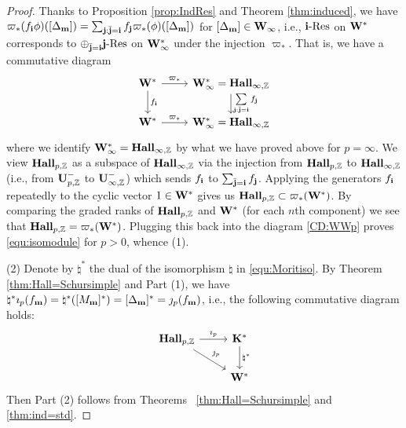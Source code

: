 \begin{proof}
 Thanks to Proposition \ref{prop:IndRes} and Theorem \ref{thm:induced}, we have $\varpi_*(f_{\mathbf{i}} \phi) ([\Delta_{\mathbf{m}}]) =\sum _{\mathbf{j}:\bar{\mathbf{j}}=\mathbf{i} } f_{\mathbf{j}} \varpi_* (\phi) ([\Delta_{\mathbf{m}}])$ for $[\Delta_{\mathbf{m}}] \in \mathbf{W}_\infty$,  i.e., $\mathbf{i}\text{-Res}$ on $\mathbf{W}^*$ corresponds to  $\oplus_{ \bar{\mathbf{j}}=\mathbf{i} } \mathbf{j}\text{-Res}$ on $\mathbf{W}^*_\infty$ under the injection $ \varpi_*$.   
That is, we have a commutative diagram 
\begin{equation}  \label{CD:WWp}
\begin{tikzcd}
\bfW^* \ar[r,"\varpi_*"]\ar[d,"f_\bfi"] &\bfW^*_\infty= \bold{Hall}_{\infty,\Z} \ar[d,"\sum\limits_{\bfj:\bar \bfj=\bfi} f_\bfj"]
\\
\bfW^* \ar[r,"\varpi_*"] &\bfW^*_\infty= \bold{Hall}_{\infty,\Z}
\end{tikzcd} 
\end{equation}
where we identify $ \mathbf{W}^*_\infty =\bold{Hall}_{\infty,\mathbb{Z}}$ by what we have proved above for $p=\infty$. 
We view $\bold{Hall}_{p,\mathbb{Z}}$ as a subspace of $\bold{Hall}_{\infty,\mathbb{Z}}$ via the injection from $\bold{Hall}_{p,\mathbb{Z}}$ to $\bold{Hall}_{\infty,\mathbb{Z}}$ (i.e., from $\bold{U}_{p,\mathbb{Z}}^-$ to $\bold{U}_{\infty,\mathbb{Z}}^-$) which sends $f_{\mathbf{i}}$ to $\sum_{\bar {\mathbf{j}}=\mathbf{i}} f_{\mathbf{j}}$. Applying the generators $f_{\mathbf{i}}$ repeatedly to the cyclic vector $1\in \mathbf{W}^*$ gives us $\bold{Hall}_{p,\mathbb{Z}}\subset \varpi_* ( \mathbf{W}^*)$. By comparing the graded ranks of $\bold{Hall}_{p,\mathbb{Z}}$ and $ \mathbf{W}^*$ (for each $n$th component) we see that $\bold{Hall}_{p,\mathbb{Z}} = \varpi_*(\mathbf{W}^*)$. Plugging this back into the diagram \eqref{CD:WWp} proves \eqref{equ:isomodule} for $p>0$, whence (1).

(2) Denote by $\natural^*$ the dual of the  isomorphism  $\natural$ in \eqref{equ:Moritiso}. By Theorem \ref{thm:Hall=Schursimple} and Part (1), we have $\natural^* \imath_p (f_{\mathbf{m}}) = \natural^*([M_{\mathbf{m}}]^*) =[\Delta_{\mathbf{m}}]^* = \jmath_p(f_{\mathbf{m}})$, i.e., the
following commutative diagram holds:
\begin{equation*}  
\begin{tikzcd}
\HallZ\ar[r,"\imath_p"]\ar[dr,"\jmath_p"] &\K^*\ar[d,"\natural^*"]
\\
 &\bfW^*
\end{tikzcd} 
\end{equation*}
Then Part (2) follows from Theorems~ \ref{thm:Hall=Schursimple} and \ref{thm:ind=std}.
\end{proof}